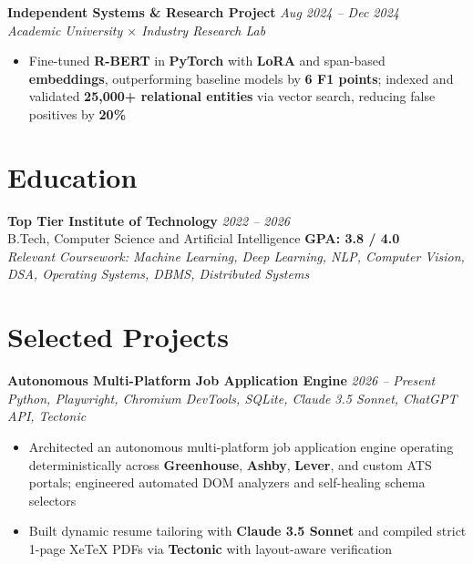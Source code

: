 \documentclass[10pt]{article}
\begin{document}
\textbf{Independent Systems \& Research Project} \hfill \textcolor{subheadingcolor}{\textit{Aug 2024 -- Dec 2024}} \\
\textit{Academic University $\times$ Industry Research Lab}
\begin{itemize}
    \item Fine-tuned \textbf{R-BERT} in \textbf{PyTorch} with \textbf{LoRA} and span-based \textbf{embeddings}, outperforming baseline models by \textbf{6 F1 points}; indexed and validated \textbf{25,000+ relational entities} via vector search, reducing false positives by \textbf{20\%}
\end{itemize}
\vspace{-0.45em}

\section*{Education}
\textbf{Top Tier Institute of Technology} \hfill \textit{2022 -- 2026} \\
B.Tech, Computer Science and Artificial Intelligence \hfill \textbf{GPA: 3.8 / 4.0} \\[0.05em]
{\small \textit{Relevant Coursework: Machine Learning, Deep Learning, NLP, Computer Vision, DSA, Operating Systems, DBMS, Distributed Systems}}
\vspace{-0.35em}

\section*{Selected Projects}

\textbf{Autonomous Multi-Platform Job Application Engine} \hfill \href{https://github.com/username/project}{\faGithub} \textcolor{subheadingcolor}{\textit{2026 -- Present}} \\
\textit{Python, Playwright, Chromium DevTools, SQLite, Claude 3.5 Sonnet, ChatGPT API, Tectonic}
\begin{itemize}
    \item Architected an autonomous multi-platform job application engine operating deterministically across \textbf{Greenhouse}, \textbf{Ashby}, \textbf{Lever}, and custom ATS portals; engineered automated DOM analyzers and self-healing schema selectors
    \item Built dynamic resume tailoring with \textbf{Claude 3.5 Sonnet} and compiled strict 1-page XeTeX PDFs via \textbf{Tectonic} with layout-aware verification
\end{itemize}
\vspace{-0.25em}
\end{document}
